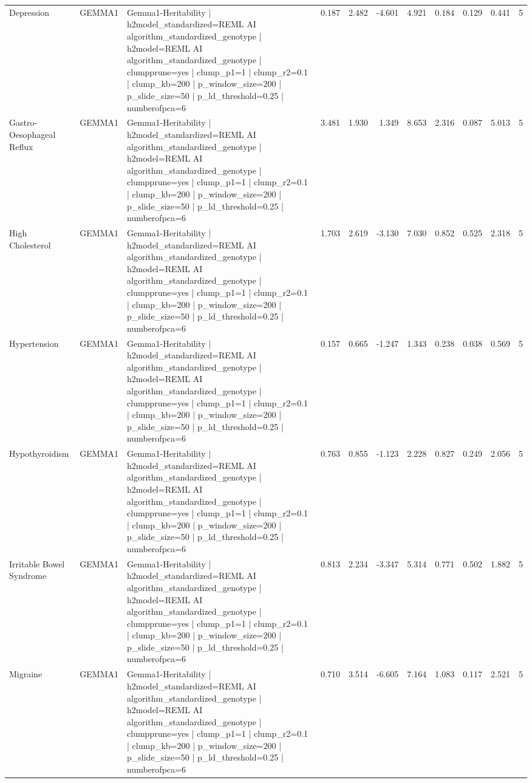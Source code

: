\begin{landscape}
\begin{longtable}{p{2.4cm}p{1.8cm}p{6.0cm}rrrrrrrr}
Depression & GEMMA1 & Gemma1-Heritability | h2model\_standardized=REML AI algorithm\_standardized\_genotype | h2model=REML AI algorithm\_standardized\_genotype | clumpprune=yes | clump\_p1=1 | clump\_r2=0.1 | clump\_kb=200 | p\_window\_size=200 | p\_slide\_size=50 | p\_ld\_threshold=0.25 | numberofpca=6 & 0.187 & 2.482 & -4.601 & 4.921 & 0.184 & 0.129 & 0.441 & 5 \\
Gastro-Oesophageal Reflux & GEMMA1 & Gemma1-Heritability | h2model\_standardized=REML AI algorithm\_standardized\_genotype | h2model=REML AI algorithm\_standardized\_genotype | clumpprune=yes | clump\_p1=1 | clump\_r2=0.1 | clump\_kb=200 | p\_window\_size=200 | p\_slide\_size=50 | p\_ld\_threshold=0.25 | numberofpca=6 & 3.481 & 1.930 & 1.349 & 8.653 & 2.316 & 0.087 & 5.013 & 5 \\
High Cholesterol & GEMMA1 & Gemma1-Heritability | h2model\_standardized=REML AI algorithm\_standardized\_genotype | h2model=REML AI algorithm\_standardized\_genotype | clumpprune=yes | clump\_p1=1 | clump\_r2=0.1 | clump\_kb=200 | p\_window\_size=200 | p\_slide\_size=50 | p\_ld\_threshold=0.25 | numberofpca=6 & 1.703 & 2.619 & -3.130 & 7.030 & 0.852 & 0.525 & 2.318 & 5 \\
Hypertension & GEMMA1 & Gemma1-Heritability | h2model\_standardized=REML AI algorithm\_standardized\_genotype | h2model=REML AI algorithm\_standardized\_genotype | clumpprune=yes | clump\_p1=1 | clump\_r2=0.1 | clump\_kb=200 | p\_window\_size=200 | p\_slide\_size=50 | p\_ld\_threshold=0.25 | numberofpca=6 & 0.157 & 0.665 & -1.247 & 1.343 & 0.238 & 0.038 & 0.569 & 5 \\
Hypothyroidism & GEMMA1 & Gemma1-Heritability | h2model\_standardized=REML AI algorithm\_standardized\_genotype | h2model=REML AI algorithm\_standardized\_genotype | clumpprune=yes | clump\_p1=1 | clump\_r2=0.1 | clump\_kb=200 | p\_window\_size=200 | p\_slide\_size=50 | p\_ld\_threshold=0.25 | numberofpca=6 & 0.763 & 0.855 & -1.123 & 2.228 & 0.827 & 0.249 & 2.056 & 5 \\
Irritable Bowel Syndrome & GEMMA1 & Gemma1-Heritability | h2model\_standardized=REML AI algorithm\_standardized\_genotype | h2model=REML AI algorithm\_standardized\_genotype | clumpprune=yes | clump\_p1=1 | clump\_r2=0.1 | clump\_kb=200 | p\_window\_size=200 | p\_slide\_size=50 | p\_ld\_threshold=0.25 | numberofpca=6 & 0.813 & 2.234 & -3.347 & 5.314 & 0.771 & 0.502 & 1.882 & 5 \\
Migraine & GEMMA1 & Gemma1-Heritability | h2model\_standardized=REML AI algorithm\_standardized\_genotype | h2model=REML AI algorithm\_standardized\_genotype | clumpprune=yes | clump\_p1=1 | clump\_r2=0.1 | clump\_kb=200 | p\_window\_size=200 | p\_slide\_size=50 | p\_ld\_threshold=0.25 | numberofpca=6 & 0.710 & 3.514 & -6.605 & 7.164 & 1.083 & 0.117 & 2.521 & 5 \\

\end{longtable}
\end{landscape}
